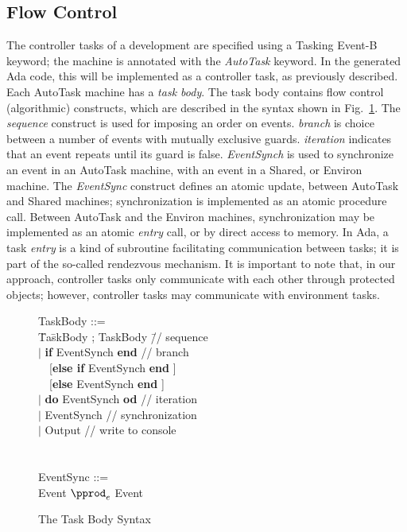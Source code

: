 \subsection{Flow Control}
The controller tasks of a development are specified using a Tasking Event-B keyword; the machine is annotated with the \emph{AutoTask} keyword. In the generated Ada code, this will be implemented as a controller task, as previously described. Each AutoTask machine has a \emph{task body}.  The task body contains flow control (algorithmic) constructs, which are described in the syntax shown in Fig.~\ref{fig:Syntax}.  The \emph{sequence} construct is used for imposing an order on events. \emph{branch} is choice between a number of events with mutually exclusive guards. \emph{iteration} indicates that an event repeats until its guard is false. \emph{EventSynch} is used to synchronize an event in an AutoTask machine, with an event in a Shared, or Environ machine. The \emph{EventSync} construct defines an atomic update, between AutoTask and Shared machines; synchronization is implemented as an atomic procedure call. Between AutoTask and the Environ machines, synchronization may be implemented as an atomic \emph{entry} call, or by direct access to memory. In Ada, a task \emph{entry} is a kind of subroutine facilitating communication between tasks; it is part of the so-called rendezvous mechanism. It is important to note that, in our approach, controller tasks only communicate with each other through protected objects; however, controller tasks may communicate with environment tasks. 
%
\begin{figure}
\centering
\begin{minipage}{\textwidth}
\begin{tabbing}
TaskBody ::= \\
\quad\= Ta\=skBody ; TaskBody \qquad\qquad \=// sequence\\
\>   $|$ \>\textbf{if} EventSynch \textbf{end} 		\>// branch\\
\>~~[\>\textbf{else if} EventSynch \textbf{end} ] \\
\>~~[\>\textbf{else} EventSynch \textbf{end} ]\\
\>  $|$ \>\textbf{do} EventSynch \textbf{od} \>  // iteration\\
\>  $|$ \>EventSynch	\> // synchronization		\\
\> $|$ \> Output	\>// write to console\\
\\
\\
EventSync ::=			\\
\>\>  Event $\pprod_e$ Event 
\end{tabbing}
\end{minipage}
 \caption{The Task Body Syntax}
 \label{fig:Syntax}
\end{figure}
%
